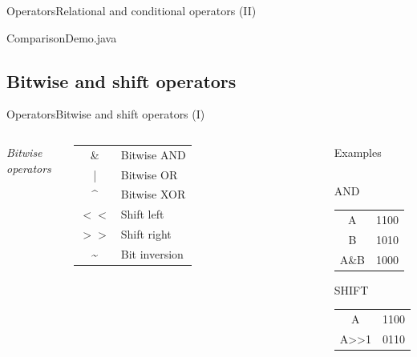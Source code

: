 \documentclass[10pt,compress]{beamer} %
\begin{document}
\begin{frame}{Operators}{Relational and conditional operators (II)}
	\begin{block}{ComparisonDemo.java}
		\vspace{-0.2cm}
		
		\vspace{-0.2cm}
	\end{block}
\end{frame}

\subsection{Bitwise and shift operators}

\begin{frame}{Operators}{Bitwise and shift operators (I)}
    \begin{columns}
		\centering \textit{Bitwise operators}
		\centering \begin{tabular}{cl}
		\& 	 & Bitwise AND 	\\
		|  	 & Bitwise OR		\\
		{}\^{} & Bitwise XOR\\
		$<<$   & Shift left \\
		$>>$ 	 & Shift right \\
		\~{} & Bit inversion \\
		\end{tabular}

		\begin{block}{Examples}
    	\begin{columns}
		\begin{center}
		AND
		\footnotesize{
		\centering \begin{tabular}{|c|c|}\hline
		A	 &1100 \\
		B 	 &1010 \\
		A\&B &1000 \\\hline
		\end{tabular}
		\normalsize{SHIFT}
		\footnotesize{
		\begin{tabular}{|c|c|}\hline
		A    &1100 \\
		A>>1 &0110 \\\hline
		\end{tabular}
		}
		}
		\end{center}


\end{columns}
\end{block}
\end{columns}
\end{frame}
\end{document}
